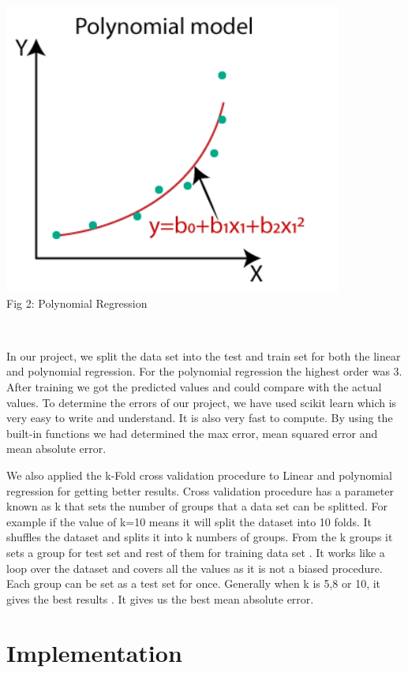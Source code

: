 \documentclass{IEEEtran}
\begin{document}
\begin{left}
\centering
\includegraphics[scale=1]{polynomial.PNG}
\\\caption{Fig 2: Polynomial Regression}\\
\label{fig_PolynomialRegression}
\end{left}

In our project, we split the data set into the test and train set for both the linear and polynomial regression. For the polynomial regression the highest order was 3. After training we got the predicted values and could compare with the actual values. To determine the errors of our project, we have used scikit learn which is very easy to write and understand. It is also very fast to compute. By using the built-in functions we had determined the max error, mean squared error and mean absolute error. 

We also applied the k-Fold cross validation procedure to Linear and polynomial regression for getting better results. Cross validation procedure has a parameter known as k that sets the number of groups that a data set can be splitted. For example if the value of k=10 means it will split the dataset into 10 folds. It shuffles the dataset and splits it into k numbers of groups. From the k groups it sets a group for test set and rest of them for training data set	. It works like a loop over the dataset and covers all the values as it is not a biased procedure. Each group can be set as a test set for once. Generally when k is 5,8 or 10, it gives the best results \cite{Bb}. It gives us the best mean absolute error.

\section{Implementation}
\end{document}
